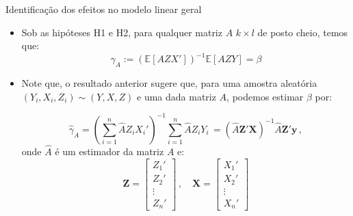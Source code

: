 \documentclass[11pt]{beamer}
\begin{document}
\begin{frame}{Identificação dos efeitos no modelo linear geral}
\begin{itemize}
	\item Sob as hipóteses H1 e H2, {\color{red}para qualquer matriz $A$ $k\times l$} de posto cheio, temos que:
	$$ \gamma_A := (\mathbb{E}[AZX'])^{-1}\mathbb{E}[AZY] = \beta$$
	\item Note que, o resultado anterior sugere que, para uma amostra aleatória $(Y_i,X_i, Z_i)\sim (Y,X,Z)$ e uma dada matriz $A$, podemos estimar $\beta$ por:
	
	$$\hat{\gamma}_A = \left(\sum_{i=1}^n \hat{A} Z_i X_i'\right)^{-1}\sum_{i=1}^n \hat{A} Z_i Y_i\, = (\hat{A} \boldsymbol{Z}'\boldsymbol{X})^{-1}\hat{A} \boldsymbol{Z}' \boldsymbol{y}\, ,$$
	onde $\hat{A}$ é um estimador da matriz $A$ e:
	$$\boldsymbol{Z} = \begin{bmatrix}
		Z_1' \\
		Z_2' \\
		\vdots \\
		Z_n'
	\end{bmatrix}\, , \quad \boldsymbol{X} = \begin{bmatrix}
	X_1' \\
	X_2' \\
	\vdots \\
	X_n'
	\end{bmatrix} $$
\end{itemize}

\end{frame}
\end{document}
